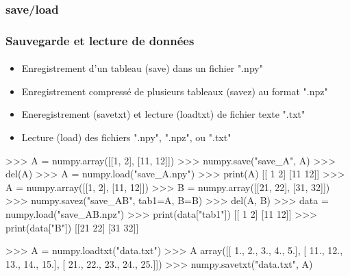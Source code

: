 \subsubsection{save/load}
\begin{frame}[fragile]
\frametitle{Sauvegarde et lecture de données}
\framesubtitle{}
\begin{itemize}
 \item Enregistrement d'un tableau (save) dans un fichier ".npy"
 \item Enregistrement compressé de plusieurs tableaux (savez) au format ".npz"
 \item Eneregistrement (savetxt) et lecture (loadtxt) de fichier texte ".txt"
 \item Lecture (load) des fichiers ".npy", ".npz", ou ".txt"
\end{itemize}
\begin{minipage}{6cm}
\begin{pythonConsole}
>>> A = numpy.array([[1, 2], [11, 12]])
>>> numpy.save("save_A", A)
>>> del(A)
>>> A = numpy.load("save_A.npy")
>>> print(A)
[[ 1  2]
 [11 12]]
>>> A = numpy.array([[1, 2], [11, 12]])
>>> B = numpy.array([[21, 22], [31, 32]])
>>> numpy.savez("save_AB", tab1=A, B=B)
>>> del(A, B)
>>> data = numpy.load("save_AB.npz")
>>> print(data["tab1"])
[[ 1  2]
 [11 12]]
>>> print(data["B"])
[[21 22]
 [31 32]]
\end{pythonConsole}
\end{minipage}
\begin{minipage}{4cm}
\begin{pythonConsole}
>>> A = numpy.loadtxt("data.txt")
>>> A
array([[  1.,   2.,   3.,   4.,   5.],
       [ 11.,  12.,  13.,  14.,  15.],
       [ 21.,  22.,  23.,  24.,  25.]])
>>> numpy.savetxt("data.txt", A)
\end{pythonConsole}
\end{minipage}
\end{frame}
